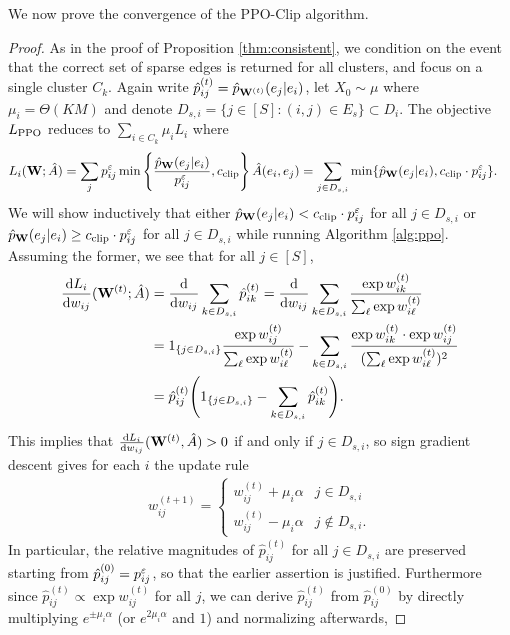 We now prove the convergence of the PPO-Clip algorithm.

\begin{proof}
As in the proof of Proposition \ref{thm:consistent}, we condition on the event that the correct set of sparse edges is returned for all clusters, and focus on a single cluster $C_k$. Again write $\hat{p}_{ij}^{(t)} = \hat{p}_{\mathbf{W}^{(t)}} (e_j|e_i)$, let $X_0\sim\mu$ where $\mu_i=\Theta(KM)$ and denote $D_{s,i}=\{j\in[S]: (i,j)\in E_s\} \subset D_i$. The objective $L_{\operatorname{PPO}}$ reduces to $\sum_{i\in C_k}\mu_i L_i$ where
\begin{align*}
L_i(\mathbf{W};\hat{A}) &= \sum_j p_{ij}^\varepsilon \min\left\{\frac{\hat{p}_{\mathbf{W}}(e_j|e_i)}{p_{ij}^\varepsilon}, c_{\operatorname{clip}}\right\} \hat{A}(e_i,e_j) = \sum_{j\in D_{s,i}} \min\{\hat{p}_{\mathbf{W}}(e_j|e_i), c_{\operatorname{clip}}\cdot p_{ij}^\varepsilon\}.
\end{align*}
We will show inductively that either $\hat{p}_{\mathbf{W}}(e_j|e_i)<c_{\operatorname{clip}}\cdot p_{ij}^\varepsilon$ for all $j\in D_{s,i}$ or $\hat{p}_{\mathbf{W}}(e_j|e_i)\ge c_{\operatorname{clip}}\cdot p_{ij}^\varepsilon$ for all $j\in D_{s,i}$ while running Algorithm \ref{alg:ppo}. Assuming the former, we see that for all $j\in[S]$,
\begin{align*}
\frac{\mathop{}\!\mathrm{d} L_i}{\mathop{}\!\mathrm{d} w_{ij}}(\mathbf{W}^{(t)};\hat{A}) &= \frac{\mathop{}\!\mathrm{d}}{\mathop{}\!\mathrm{d} w_{ij}} \sum_{k\in D_{s,i}} \hat{p}_{ik}^{(t)} =\frac{\mathop{}\!\mathrm{d}}{\mathop{}\!\mathrm{d} w_{ij}} \sum_{k\in D_{s,i}} \frac{\exp w_{ik}^{(t)}}{\sum_\ell \exp w_{i\ell}^{(t)}} \\
&= 1_{\{j\in D_{s,i}\}}\frac{\exp w_{ij}^{(t)}}{\sum_\ell \exp w_{i\ell}^{(t)}} - \sum_{k\in D_{s,i}} \frac{\exp w_{ik}^{(t)}\cdot \exp w_{ij}^{(t)}}{(\sum_\ell \exp w_{i\ell}^{(t)})^2} \\
&= \hat{p}_{ij}^{(t)} \Bigg(1_{\{j\in D_{s,i}\}} - \sum_{k\in D_{s,i}} \hat{p}_{ik}^{(t)}\Bigg).
\end{align*}
This implies that $\frac{\mathop{}\!\mathrm{d} L_i}{\mathop{}\!\mathrm{d} w_{ij}}(\mathbf{W}^{(t)},\hat{A})>0$ if and only if $j\in D_{s,i}$, so sign gradient descent gives for each $i$ the update rule
\begin{align*}
w_{ij}^{(t+1)} = \begin{cases}
w_{ij}^{(t)} + \mu_i\alpha & j\in D_{s,i} \\
w_{ij}^{(t)} - \mu_i\alpha & j\notin D_{s,i}.
\end{cases}
\end{align*}
In particular, the relative magnitudes of $\hat{p}_{ij}^{(t)}$ for all $j\in D_{s,i}$ are preserved starting from $\hat{p}_{ij}^{(0)}=p_{ij}^\varepsilon$, so that the earlier assertion is justified. Furthermore since $\hat{p}_{ij}^{(t)} \propto \exp w_{ij}^{(t)}$ for all $j$, we can derive $\hat{p}_{ij}^{(t)}$ from $\hat{p}_{ij}^{(0)}$ by directly multiplying $e^{\pm\mu_i\alpha}$ (or $e^{2\mu_i\alpha}$ and $1$) and normalizing afterwards,

\end{proof}
